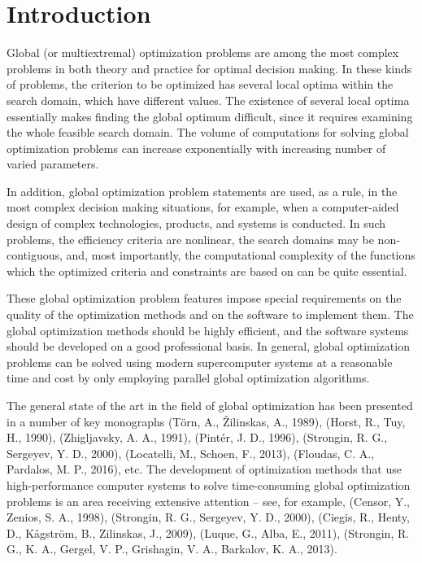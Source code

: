 \documentclass{gOMS2e}
\theoremstyle{plain}%
\theoremstyle{definition}
\theoremstyle{remark}
\begin{document}
\section{Introduction}
Global (or multiextremal) optimization problems are among the most complex problems
in both theory and practice for optimal decision making. In these kinds of problems,
the criterion to be optimized has several local optima within the search domain,
which have different values. The existence of several local optima essentially makes
finding the global optimum difficult, since it requires examining the whole feasible
search domain. The volume of computations for solving global optimization problems
can increase exponentially with increasing number of varied parameters.
\par
In addition, global optimization problem statements are used, as a rule, in the most
complex decision making situations, for example, when a computer-aided design of complex
technologies, products, and systems is conducted. In such problems, the efficiency
criteria are nonlinear, the search domains may be non-contiguous, and, most importantly,
the computational complexity of the functions which the optimized criteria and constraints
are based on can be quite essential.
\par
These global optimization problem features impose special requirements on the quality of
the optimization methods and on the software to implement them. The global optimization
methods should be highly efficient, and the software systems should be developed on a good
professional basis. In general, global optimization problems can be solved using modern
supercomputer systems at a reasonable time and cost by only employing parallel
global optimization algorithms.
\par
The general state of the art in the field of global optimization has been presented in a
number of key monographs (Törn, A., Žilinskas, A., 1989), (Horst, R., Tuy, H., 1990), (Zhigljavsky, A. A., 1991), (Pintér, J. D., 1996), (Strongin, R. G., Sergeyev, Y. D., 2000), (Locatelli, M., Schoen, F., 2013), (Floudas, C. A., Pardalos, M. P., 2016), etc.
The development of optimization methods that use high-performance computer systems to
solve time-consuming global optimization problems is an area receiving extensive
attention – see, for example, (Censor, Y., Zenios, S. A., 1998), (Strongin, R. G., Sergeyev, Y. D., 2000), (Ciegis, R., Henty, D., Kågström, B., Zilinskas, J., 2009), (Luque, G., Alba, E., 2011), (Strongin, R. G., K. A., Gergel, V. P., Grishagin, V. A., Barkalov, K. A.,  2013).
\end{document}
